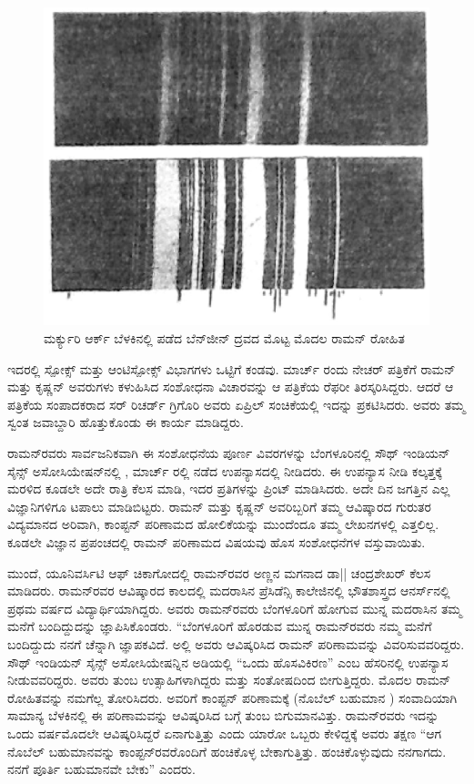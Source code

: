\begin{figure}
\includegraphics{"images/2a.jpg"}
\caption{ಮರ್ಕ್ಯುರಿ ಆರ್ಕ್ ಬೆಳಕಿನಲ್ಲಿ ಪಡೆದ ಬೆನ್‍ಜೀನ್ ದ್ರವದ ಮೊಟ್ಟ ಮೊದಲ ರಾಮನ್ ರೋಹಿತ }
\end{figure}

ಇದರಲ್ಲಿ ಸ್ಪೋಕ್ಸ್ ಮತ್ತು ಆಂಟಿಸ್ಪೋಕ್ಸ್ ವಿಭಾಗಗಳು ಒಟ್ಟಿಗೆ ಕಂಡವು.  ಮಾರ್ಚ್ ರಂದು ನೇಚರ್ ಪತ್ರಿಕೆಗೆ ರಾಮನ್ ಮತ್ತು ಕೃಷ್ಣನ್ ಅವರುಗಳು ಕಳುಹಿಸಿದ ಸಂಶೋಧನಾ ವಿಚಾರವನ್ನು ಆ ಪತ್ರಿಕೆಯ ರೆಫರೀ ತಿರಸ್ಕರಿಸಿದ್ದರು. ಆದರೆ ಆ ಪತ್ರಿಕೆಯ ಸಂಪಾದಕರಾದ ಸರ್ ರಿಚರ್ಡ್ ಗ್ರಿಗೊರಿ ಅವರು  ಏಪ್ರಿಲ್ ಸಂಚಿಕೆಯಲ್ಲಿ ಇದನ್ನು ಪ್ರಕಟಿಸಿದರು. ಅವರು ತಮ್ಮ ಸ್ವಂತ ಜವಾಬ್ದಾರಿ ಹೊತ್ತುಕೊಂಡು ಈ ಕಾರ್ಯ ಮಾಡಿದ್ದರು.

ರಾಮನ್‍ರವರು ಸಾರ್ವಜನಿಕವಾಗಿ ಈ ಸಂಶೋಧನೆಯ ಪೂರ್ಣ ವಿವರಗಳನ್ನು ಬೆಂಗಳೂರಿನಲ್ಲಿ ಸೌಥ್ ಇಂಡಿಯನ್ ಸೈನ್ಸ್ ಅಸೋಸಿಯೇಷನ್‍ನಲ್ಲಿ ,  ಮಾರ್ಚ್ ರಲ್ಲಿ ನಡೆದ ಉಪನ್ಯಾಸದಲ್ಲಿ ನೀಡಿದರು. ಈ ಉಪನ್ಯಾಸ ನೀಡಿ ಕಲ್ಕತ್ತಕ್ಕೆ ಮರಳಿದ ಕೂಡಲೇ ಅದೇ ರಾತ್ರಿ ಕೆಲಸ ಮಾಡಿ, ಇದರ  ಪ್ರತಿಗಳನ್ನು ಪ್ರಿಂಟ್ ಮಾಡಿಸಿದರು. ಅದೇ ದಿನ ಜಗತ್ತಿನ ಎಲ್ಲ ವಿಜ್ಞಾನಿಗಳಿಗೂ ಟಪಾಲು ಮಾಡಿಬಿಟ್ಟರು. ರಾಮನ್ ಮತ್ತು ಕೃಷ್ಣನ್ ಅವರಿಬ್ಬರಿಗೆ ತಮ್ಮ ಆವಿಷ್ಕಾರದ ಗುರುತರ ವಿದ್ಯಮಾನದ ಅರಿವಾಗಿ, ಕಾಂಪ್ಟನ್ ಪರಿಣಾಮದ ಹೋಲಿಕೆಯನ್ನು ಮುಂದೆಂದೂ ತಮ್ಮ ಲೇಖನಗಳಲ್ಲಿ ಎತ್ತಲಿಲ್ಲ. ಕೂಡಲೇ ವಿಜ್ಞಾನ ಪ್ರಪಂಚದಲ್ಲಿ ರಾಮನ್ ಪರಿಣಾಮದ ವಿಷಯವು ಹೊಸ ಸಂಶೋಧನೆಗಳ ವಸ್ತುವಾಯಿತು.

ಮುಂದೆ, ಯೂನಿವರ್ಸಿಟಿ ಆಫ್ ಚಿಕಾಗೋದಲ್ಲಿ ರಾಮನ್‍ರವರ ಅಣ್ಣನ ಮಗನಾದ ಡಾ|| ಚಂದ್ರಶೇಖರ್ ಕೆಲಸ ಮಾಡಿದರು. ರಾಮನ್‍ರವರ ಆವಿಷ್ಕಾರದ ಕಾಲದಲ್ಲಿ ಮದರಾಸಿನ ಪ್ರೆಸಿಡೆನ್ಸಿ ಕಾಲೇಜಿನಲ್ಲಿ ಭೌತಶಾಸ್ತ್ರದ ಆನರ್ಸ್‌ನಲ್ಲಿ ಪ್ರಥಮ ವರ್ಷದ ವಿದ್ಯಾರ್ಥಿಯಾಗಿದ್ದರು. ಅವರು ರಾಮನ್‍ರವರು ಬೆಂಗಳೂರಿಗೆ ಹೋಗುವ ಮುನ್ನ ಮದರಾಸಿನ ತಮ್ಮ ಮನೆಗೆ ಬಂದಿದ್ದುದನ್ನು ಜ್ಞಾಪಿಸಿಕೊಂಡರು. “ಬೆಂಗಳೂರಿಗೆ ಹೊರಡುವ ಮುನ್ನ ರಾಮನ್‍ರವರು ನಮ್ಮ ಮನೆಗೆ ಬಂದಿದ್ದುದು ನನಗೆ ಚೆನ್ನಾಗಿ ಜ್ಞಾಪಕವಿದೆ. ಅಲ್ಲಿ ಅವರು ಆವಿಷ್ಕರಿಸಿದ ರಾಮನ್ ಪರಿಣಾಮವನ್ನು ವಿವರಿಸುವವರಿದ್ದರು. ಸೌಥ್ ಇಂಡಿಯನ್ ಸೈನ್ಸ್ ಅಸೋಸಿಯೇಷನ್ನಿನ ಅಡಿಯಲ್ಲಿ “ಒಂದು ಹೊಸವಿಕಿರಣ” ಎಂಬ ಹೆಸರಿನಲ್ಲಿ ಉಪನ್ಯಾಸ ನೀಡುವವರಿದ್ದರು. ಅವರು ತುಂಬ ಉತ್ಸಾಹಿಗಳಾಗಿದ್ದರು ಮತ್ತು ಸಂತೋಷದಿಂದ ಬೀಗುತ್ತಿದ್ದರು. ಮೊದಲ ರಾಮನ್ ರೋಹಿತವನ್ನು ನಮಗೆಲ್ಲ ತೋರಿಸಿದರು. ಅವರಿಗೆ ಕಾಂಪ್ಟನ್ ಪರಿಣಾಮಕ್ಕೆ (ನೊಬೆಲ್ ಬಹುಮಾನ ) ಸಂವಾದಿಯಾಗಿ ಸಾಮಾನ್ಯ ಬೆಳಕಿನಲ್ಲಿ ಈ ಪರಿಣಾಮವನ್ನು ಆವಿಷ್ಕರಿಸಿದ ಬಗ್ಗೆ ತುಂಬ ಬಿಗುಮಾನವಿತ್ತು. ರಾಮನ್‍ರವರು ಇದನ್ನು ಒಂದು ವರ್ಷಮೊದಲೇ ಆವಿಷ್ಕರಿಸಿದ್ದರೆ ಏನಾಗುತ್ತಿತ್ತು ಎಂದು ಯಾರೋ ಒಬ್ಬರು ಕೇಳಿದ್ದಕ್ಕೆ ಅವರು ತಕ್ಷಣ “ಆಗ ನೊಬೆಲ್ ಬಹುಮಾನವನ್ನು ಕಾಂಪ್ಟನ್‍ರವರೊಂದಿಗೆ ಹಂಚಿಕೊಳ್ಳ ಬೇಕಾಗುತ್ತಿತ್ತು. ಹಂಚಿಕೊಳ್ಳುವುದು ನನಗಾಗದು. ನನಗೆ ಪೂರ್ತಿ ಬಹುಮಾನವೇ ಬೇಕು” ಎಂದರು. 

